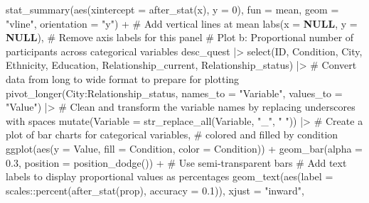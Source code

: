 \documentclass[
  bookmarksnumbered]{article}
\newenvironment{Shaded}{\begin{snugshade}}{\end{snugshade}}
\newcommand{\AttributeTok}[1]{\textcolor[rgb]{0.80,0.80,0.80}{#1}}
\newcommand{\CommentTok}[1]{\textcolor[rgb]{0.50,0.62,0.50}{#1}}
\newcommand{\ConstantTok}[1]{\textcolor[rgb]{0.86,0.64,0.64}{\textbf{#1}}}
\newcommand{\DecValTok}[1]{\textcolor[rgb]{0.86,0.86,0.80}{#1}}
\newcommand{\FloatTok}[1]{\textcolor[rgb]{0.75,0.75,0.82}{#1}}
\newcommand{\FunctionTok}[1]{\textcolor[rgb]{0.94,0.94,0.56}{#1}}
\newcommand{\NormalTok}[1]{\textcolor[rgb]{0.80,0.80,0.80}{#1}}
\newcommand{\SpecialCharTok}[1]{\textcolor[rgb]{0.86,0.64,0.64}{#1}}
\newcommand{\StringTok}[1]{\textcolor[rgb]{0.80,0.58,0.58}{#1}}
\begin{document}
\begin{Shaded}
\begin{Highlighting}[]
    \FunctionTok{stat\_summary}\NormalTok{(}\FunctionTok{aes}\NormalTok{(}\AttributeTok{xintercept =} \FunctionTok{after\_stat}\NormalTok{(x), }\AttributeTok{y =} \DecValTok{0}\NormalTok{),}
                 \AttributeTok{fun =}\NormalTok{ mean, }\AttributeTok{geom =} \StringTok{"vline"}\NormalTok{, }\AttributeTok{orientation =} \StringTok{"y"}\NormalTok{) }\SpecialCharTok{+}  \CommentTok{\# Add vertical lines at mean}
    \FunctionTok{labs}\NormalTok{(}\AttributeTok{x =} \ConstantTok{NULL}\NormalTok{, }\AttributeTok{y =} \ConstantTok{NULL}\NormalTok{),  }\CommentTok{\# Remove axis labels for this panel}
  \CommentTok{\# Plot b: Proportional number of participants across categorical variables}
\NormalTok{  desc\_quest }\SpecialCharTok{|\textgreater{}} 
    \FunctionTok{select}\NormalTok{(ID, Condition, City, Ethnicity, }
\NormalTok{           Education, Relationship\_current, Relationship\_status) }\SpecialCharTok{|\textgreater{}} 
    \CommentTok{\# Convert data from long to wide format to prepare for plotting}
    \FunctionTok{pivot\_longer}\NormalTok{(City}\SpecialCharTok{:}\NormalTok{Relationship\_status,}
                  \AttributeTok{names\_to =} \StringTok{"Variable"}\NormalTok{,}
                  \AttributeTok{values\_to =} \StringTok{"Value"}\NormalTok{) }\SpecialCharTok{|\textgreater{}} 
    \CommentTok{\# Clean and transform the variable names by replacing underscores with spaces}
    \FunctionTok{mutate}\NormalTok{(}\AttributeTok{Variable =} \FunctionTok{str\_replace\_all}\NormalTok{(Variable, }\StringTok{"\_"}\NormalTok{, }\StringTok{" "}\NormalTok{)) }\SpecialCharTok{|\textgreater{}} 
    \CommentTok{\# Create a plot of bar charts for categorical variables, }
    \CommentTok{\# colored and filled by condition}
    \FunctionTok{ggplot}\NormalTok{(}\FunctionTok{aes}\NormalTok{(}\AttributeTok{y =}\NormalTok{ Value, }\AttributeTok{fill =}\NormalTok{ Condition, }\AttributeTok{color =}\NormalTok{ Condition)) }\SpecialCharTok{+}
    \FunctionTok{geom\_bar}\NormalTok{(}\AttributeTok{alpha =} \FloatTok{0.3}\NormalTok{, }\AttributeTok{position =} \FunctionTok{position\_dodge}\NormalTok{()) }\SpecialCharTok{+}  \CommentTok{\# Use semi{-}transparent bars}
    \CommentTok{\# Add text labels to display proportional values as percentages}
    \FunctionTok{geom\_text}\NormalTok{(}\FunctionTok{aes}\NormalTok{(}\AttributeTok{label =}\NormalTok{ scales}\SpecialCharTok{::}\FunctionTok{percent}\NormalTok{(}\FunctionTok{after\_stat}\NormalTok{(prop), }\AttributeTok{accuracy =} \FloatTok{0.1}\NormalTok{)),}
                \AttributeTok{xjust =} \StringTok{"inward"}\NormalTok{,}

\end{Highlighting}
\end{Shaded}
\end{document}
